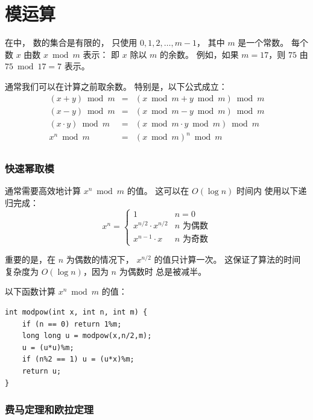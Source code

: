\section{模运算}


在中，
数的集合是有限的，
只使用 $0,1,2,\ldots,m-1$，
其中 $m$ 是一个常数。
每个数 $x$ 由数 $x \bmod m$ 表示：
即 $x$ 除以 $m$ 的余数。
例如，如果 $m=17$，则 $75$
由 $75 \bmod 17 = 7$ 表示。

通常我们可以在计算之前取余数。
特别是，以下公式成立：
\[
\begin{array}{rcl}
(x+y) \bmod m & = & (x \bmod m + y \bmod m) \bmod m \\
(x-y) \bmod m & = & (x \bmod m - y \bmod m) \bmod m \\
(x \cdot y) \bmod m & = & (x \bmod m \cdot y \bmod m) \bmod m \\
x^n \bmod m & = & (x \bmod m)^n \bmod m \\
\end{array}
\]

\subsubsection{快速幂取模}

通常需要高效地计算
$x^n \bmod m$ 的值。
这可以在 $O(\log n)$ 时间内
使用以下递归完成：
\begin{equation*}
    x^n = \begin{cases}
               1        & n = 0\\
               x^{n/2} \cdot x^{n/2} & \text{$n$ 为偶数}\\
               x^{n-1} \cdot x & \text{$n$ 为奇数}
           \end{cases}
\end{equation*}

重要的是，在 $n$ 为偶数的情况下，
$x^{n/2}$ 的值只计算一次。
这保证了算法的时间复杂度为
$O(\log n)$，因为 $n$ 为偶数时
总是被减半。

以下函数计算
$x^n \bmod m$ 的值：

\begin{lstlisting}
int modpow(int x, int n, int m) {
    if (n == 0) return 1%m;
    long long u = modpow(x,n/2,m);
    u = (u*u)%m;
    if (n%2 == 1) u = (u*x)%m;
    return u;
}
\end{lstlisting}

\subsubsection{费马定理和欧拉定理}

